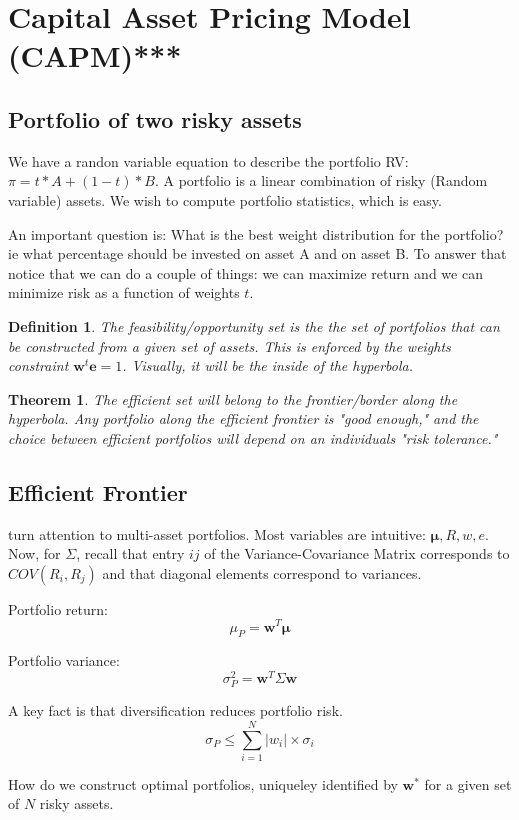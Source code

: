 \documentclass{article}
\newtheorem{definition}{Definition}
\newtheorem{theorem}{Theorem}
\begin{document}
\section{Capital Asset Pricing Model (CAPM)***}
\subsection{Portfolio of two risky assets}
We have a randon variable equation to describe the portfolio RV: $\pi = t*A + (1-t)*B$. A portfolio is a linear combination of risky (Random variable) assets. We wish to compute portfolio statistics, which is easy. 

An important question is: What is the best weight distribution for the portfolio? ie what percentage should be invested on asset A and on asset B. To answer that notice that we can do a couple of things: we can maximize return and we can minimize risk as a function of weights $t$.

\begin{definition}
The feasibility/opportunity set is the the set of portfolios that can be constructed from a given set of assets. This is enforced by the weights constraint $\bm{w}^t \bm{e} = 1 $. Visually, it will be the inside of the hyperbola. 
\end{definition}

\begin{theorem}
The efficient set will belong to the frontier/border along the hyperbola. Any portfolio along the efficient frontier is "good enough," and the choice  between efficient portfolios will depend on an individuals "risk tolerance."
\end{theorem}

\subsection{Efficient Frontier}
turn attention to multi-asset portfolios. Most variables are intuitive: $\bm{\mu}, R, w, e$. Now, for $\Sigma$, recall that entry $ij$ of the Variance-Covariance Matrix corresponds to $COV(R_i, R_j)$ and that diagonal elements correspond to variances. 

Portfolio return: 
\[ \mu_P = \bm{w}^T \bm\mu \]

Portfolio variance:
\[ \sigma_P^2 = \bm{w}^T \Sigma \bm{w} \]

A key fact is that diversification reduces portfolio risk. 
\[ \sigma_P \leq \sum_{i=1}^N |w_i| \times \sigma_i \]

How do we construct optimal portfolios, uniqueley identified by $\bm w^*$ for a given set of $N$ risky assets.
\end{document}
